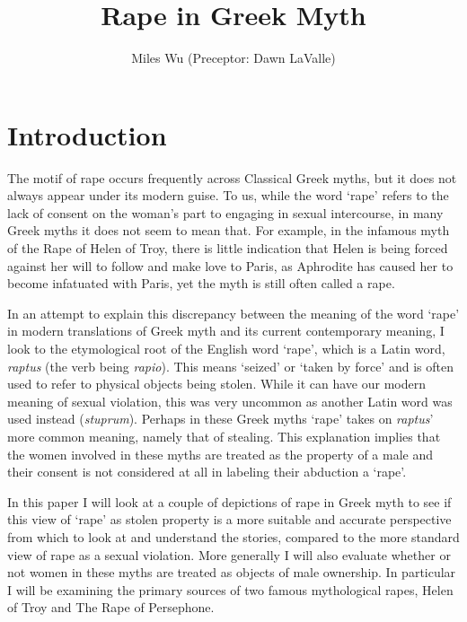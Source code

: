 \documentclass[11pt]{article}
\begin{document}
\title{Rape in Greek Myth}
\author{Miles Wu (Preceptor: Dawn LaValle)}
\maketitle

\begin{abstract}

\end{abstract}

\newpage

\section{Introduction}
The motif of rape occurs frequently across Classical Greek myths, but it does not always appear under its modern guise.
To us, while the word `rape' refers to the lack of consent on the woman's part to engaging in sexual intercourse, in many Greek myths it does not seem to mean that.
For example, in the infamous myth of the Rape of Helen of Troy, there is little indication that Helen is being forced against her will to follow and make love to Paris, as Aphrodite has caused her to become infatuated with Paris, yet the myth is still often called a rape.

In an attempt to explain this discrepancy between the meaning of the word `rape' in modern translations of Greek myth and its current contemporary meaning, I look to the etymological root of the English word `rape', which is a Latin word, \emph{raptus} (the verb being \emph{rapio}).
This means `seized' or `taken by force' and is often used to refer to physical objects being stolen.
While it can have our modern meaning of sexual violation, this was very uncommon as another Latin word was used instead (\emph{stuprum}).
Perhaps in these Greek myths `rape' takes on \emph{raptus}' more common meaning, namely that of stealing.
This explanation implies that the women involved in these myths are treated as the property of a male and their consent is not considered at all in labeling their abduction a `rape'.

In this paper I will look at a couple of depictions of rape in Greek myth to see if this view of `rape' as stolen property is a more suitable and accurate perspective from which to look at and understand the stories, compared to the more standard view of rape as a sexual violation.
More generally I will also evaluate whether or not women in these myths are treated as objects of male ownership.
In particular I will be examining the primary sources of two famous mythological rapes, Helen of Troy and The Rape of Persephone.
\end{document}
